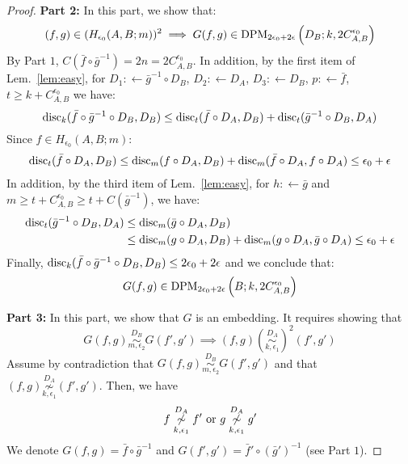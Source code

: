 \documentclass{article} %
\newcommand{\disc}{\textnormal{disc}}
\begin{document}
\begin{proof}
\textbf{Part 2:} In this part, we show that:
\begin{equation}
(f,g) \in (H_{\epsilon_0}(A,B;m))^2 \implies G(f,g) \in \textnormal{DPM}_{2\epsilon_0+2\epsilon}\left(D_B;k,2C^{\epsilon_0}_{A,B} \right)
\end{equation}
By Part $1$, $C(\bar{f} \circ \bar{g}^{-1}) = 2n = 2C^{\epsilon_0}_{A,B}$. In addition, by the first item of Lem.~\ref{lem:easy}, for $D_1 :\leftarrow \bar{g}^{-1} \circ D_B$, $D_2 :\leftarrow D_A$, $D_3 :\leftarrow D_B$, $p:\leftarrow \bar{f}$, $t \geq k + C^{\epsilon_0}_{A,B}$ we have: 
\begin{equation}
\disc_k(\bar{f}\circ \bar{g}^{-1} \circ D_B,D_B) \leq \disc_{t}(\bar{f} \circ D_A,D_B) + \disc_{t}(\bar{g}^{-1} \circ D_B, D_A) 
\end{equation}
Since $f \in H_{\epsilon_0}(A,B;m)$:
\begin{equation}
\begin{aligned}
\disc_{t}(\bar{f} \circ D_A,D_B) \leq \disc_m(f \circ D_A,D_B) + \disc_m(\bar{f} \circ D_A,f \circ D_A) \leq \epsilon_0+\epsilon
\end{aligned}
\end{equation}
In addition, by the third item of Lem.~\ref{lem:easy}, for $h :\leftarrow \bar{g}$ and $m \geq t+C^{\epsilon_0}_{A,B} \geq t + C(\bar{g}^{-1})$, we have:
\begin{equation}
\begin{aligned}
\disc_{t}(\bar{g}^{-1} \circ D_B, D_A) &\leq \disc_{m}(\bar{g} \circ D_A, D_B) \\
&\leq \disc_{m}(g \circ D_A, D_B) + \disc_m(g \circ D_A, \bar{g} \circ D_A) \leq \epsilon_0+\epsilon
\end{aligned}
\end{equation}
Finally, $\disc_k(\bar{f}\circ \bar{g}^{-1} \circ D_B,D_B) \leq 2\epsilon_0+2\epsilon$ and we conclude that:
\begin{equation}
G(f,g) \in \textnormal{DPM}_{2\epsilon_0+2\epsilon}\left(B;k,2C^{\epsilon_0}_{A,B} \right)
\end{equation}

\textbf{Part 3:} In this part, we show that $G$ is an embedding. It requires showing that 
\begin{equation}
G(f,g) \overset{D_B}{\underset{m,\epsilon_2}{\sim}}  G(f',g') \implies (f,g) \left( \overset{D_A}{\underset{k,\epsilon_1}{\sim}} \right)^2  (f',g')
\end{equation}
Assume by contradiction that $G(f,g) \overset{D_B}{\underset{m,\epsilon_2}{\sim}}  G(f',g')$ and that $(f,g) \overset{D_A}{\underset{k,\epsilon_1}{\not\sim}}   (f',g')$. Then, we have 
\begin{equation}
f \overset{D_A}{\underset{k,\epsilon_1}{\not\sim}} f' \textnormal{ or } g \overset{D_A}{\underset{k,\epsilon_1}{\not\sim}} g'
\end{equation}
We denote $G(f,g) = \bar{f} \circ \bar{g}^{-1}$ and $G(f',g') = \bar{f}' \circ (\bar{g}')^{-1}$ (see Part $1$).


\end{proof}
\end{document}
